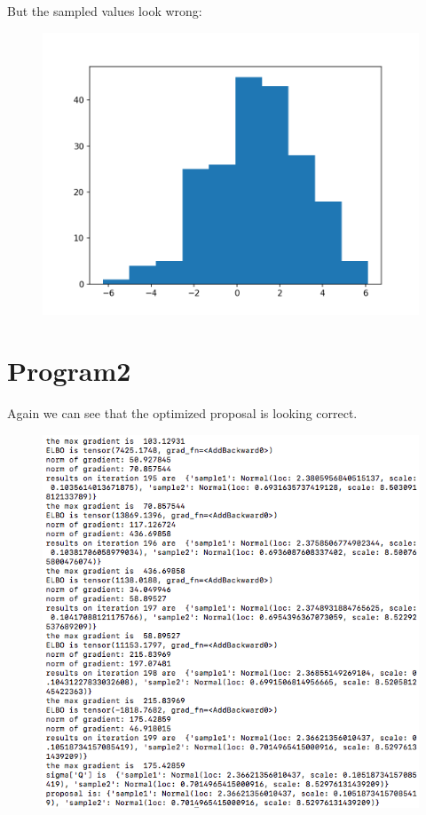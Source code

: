 \documentclass[12pt]{article}%
\theoremstyle{definition}
\begin{document}
	\newpage 
	But the sampled values look wrong:
	
	\begin{figure}[h]
	\includegraphics[scale=0.7]{p1histogram.png}
	\end{figure}
	


	\newpage
	

	
	\section{Program2}
		Again we can see that the optimized proposal is looking correct.
	\begin{figure}[h]
	\includegraphics[scale=0.7]{p2proposal}
	\end{figure}
	
\end{document}
